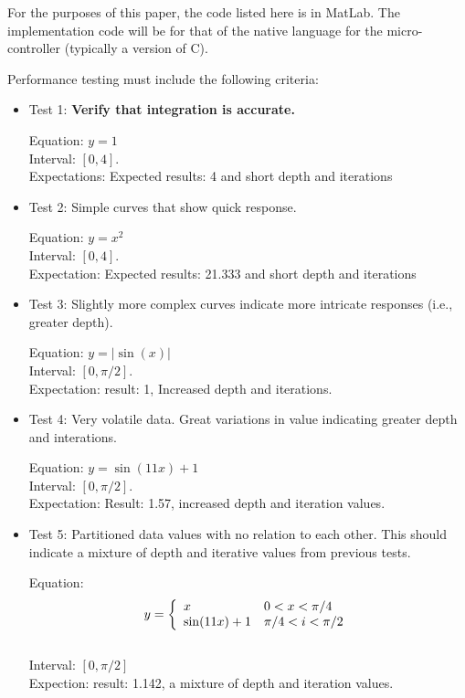 \documentclass[12pt,a4paper]{report}
\begin{document}

For the purposes of this paper, the code listed here is in MatLab.  The implementation code will be for that of the native language for the micro-controller (typically a version of C).  \\




Performance testing must include the following criteria:
\begin{itemize}
	\item Test 1: \textbf{Verify that integration is accurate.}
	
	Equation: $y=1$\\
	Interval:  $[0, 4]$.\\
	Expectations:  Expected results: 4 and short depth and iterations
	
	\item Test 2: Simple curves that show quick response.
	
	Equation: $y=x^2$\\
	Interval: $[0, 4]$.\\
	Expectation:  Expected results: 21.333 and short depth and iterations
	
	\item Test 3: Slightly more complex curves indicate more intricate responses (i.e., greater depth).
	
	Equation: $y= |\sin(x)|$\\
	Interval: $[0, \pi/2]$.\\
	Expectation:  result: 1, Increased depth and iterations.
	
	\item Test 4: Very volatile data.  Great variations in value indicating greater depth and interations.
	
	Equation: $y= \sin(11x)+1$\\
	Interval: $[0, \pi/2]$.\\
	Expectation: Result: 1.57, increased depth and iteration values.
	
	\item Test 5: Partitioned data values with no relation to each other.  This should indicate a mixture of depth and iterative values from previous tests.
	
	Equation:
	\begin{align*}
		y = \left \{ \begin{array}{ll} x & 0< x< \pi/4\\ \sin(11x)+1 & \pi/4 < i < \pi/2 \end{array} \right .
	\end{align*}\\
	Interval: $[0,\pi/2]$\\
	Expection: result: 1.142, a mixture of depth and iteration values.
\end{itemize}
\end{document}
